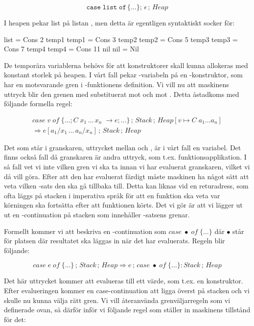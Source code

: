 \documentclass[../Core]{subfiles}
\begin{document}
\[
\mathtt{case\; list\; of\,\lbrace\ldots\rbrace};\,\epsilon\,;\, Heap\]


I heapen pekar list på listan \miniCode{[2,3,5,7,11]}, men detta är egentligen syntaktiskt socker
för:

\begin{codeEx}
list = Cons 2 temp1
temp1 = Cons 3 temp2
temp2 = Cons 5 temp3
temp3 = Cons 7 temp4
temp4 = Cons 11 nil
nil = Nil
\end{codeEx}

De temporära variablerna behövs för att konstruktorer skall kunna
allokeras med konstant storlek på heapen. I vårt fall pekar
-variabeln på en -konstruktor, som har en motsvarande gren
i -funktionens definition. Vi vill nu att maskinens uttryck
blir den grenen med  substituerat mot  och  mot .
Detta åstadkoms med följande formella regel:

\begin{multline*}
case\; v\; of\;\{\ldots;C\; x_{1}\,\ldots\, x_{n}\;\rightarrow e;\ldots\}\,;\, Stack\,;\, Heap[v\mapsto C\; a_{1}\ldots a_{n}]\\
\Rightarrow e[a_{1}/x_{1}\,\ldots\, a_{n}/x_{n}]\,;\, Stack\,;\, Heap\end{multline*}


Det som står i granskaren, uttrycket mellan  och , är i vårt
fall en variabel. Det finns också fall då granskaren är andra uttryck, som
t.ex. funktionsapplikation. I så fall vet vi inte vilken gren vi ska
ta innan vi har evaluerat granskaren, vilket vi då vill göra.
Efter att den har evaluerat färdigt måste maskinen ha något sätt att
veta vilken -sats den ska gå tillbaka till. Detta kan liknas
vid en returadress, som ofta läggs på stacken i imperativa språk för att
en funktion ska veta var körningen ska fortsätta efter att funktionen körts.
Det vi gör är att vi lägger ut ut en -continuation på stacken
som innehåller -satsens grenar.

Formellt kommer vi att beskriva en -continuation som $case\;\bullet\; of\;\{\ldots\}$
där $\bullet$ står för platsen där resultatet ska läggas in när det har evaluerats. Regeln
blir följande:

\[
case\; e\; of\;\{\ldots\}\,;\, Stack\,;\, Heap\Rightarrow e\,;\, case\;\bullet\; of\;\{\ldots\}:Stack\,;\, Heap\]


Det här uttrycket kommer att evalueras till ett värde, som t.ex. en konstruktor.
Efter evalueringen kommer en case-continuation att ligga överst på stacken och vi skulle nu kunna välja
rätt gren. Vi vill återanvända grenväljarregeln som vi definerade
ovan, så därför inför vi följande regel som ställer in maskinens tillstånd för det:
\end{document}
